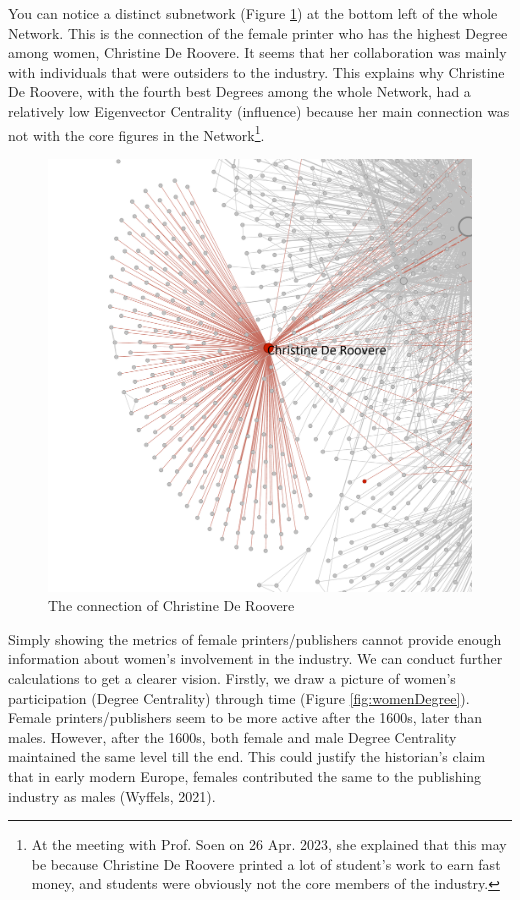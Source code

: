 \documentclass[12pt,a4paper,oneside]{book}
\begin{document}
\begin{sloppypar}
You can notice a distinct subnetwork (Figure \ref{fig:christineDeRoovere}) at the bottom left of the whole Network. This is the connection of the female printer who has the highest Degree among women, Christine De Roovere. It seems that her collaboration was mainly with individuals that were outsiders to the industry. This explains why Christine De Roovere, with the fourth best Degrees among the whole Network, had a relatively low Eigenvector Centrality (influence) because her main connection was not with the core figures in the Network\footnote{At the meeting with Prof. Soen on 26 Apr. 2023, she explained that this may be because Christine De Roovere printed a lot of student’s work to earn fast money, and students were obviously not the core members of the industry.}.

\begin{figure}[H]
\centering
\includegraphics[scale=0.6]{graph/Christine De Roovere.png}
\caption{The connection of Christine De Roovere}
\label{fig:christineDeRoovere}
\end{figure}

Simply showing the metrics of female printers/publishers cannot provide enough information about women’s involvement in the industry. We can conduct further calculations to get a clearer vision. Firstly, we draw a picture of women’s participation (Degree Centrality) through time (Figure \ref{fig:womenDegree}). Female printers/publishers seem to be more active after the 1600s, later than males. However, after the 1600s, both female and male Degree Centrality maintained the same level till the end. This could justify the historian’s claim that in early modern Europe, females contributed the same to the publishing industry as males (Wyffels, 2021).


\end{sloppypar}
\end{document}
